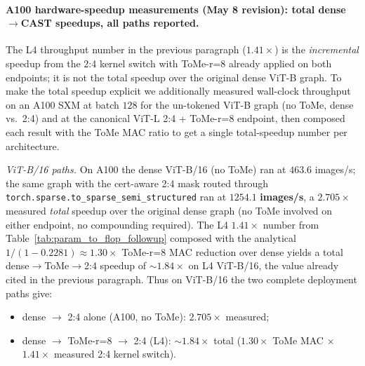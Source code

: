 \documentclass[11pt]{article}
\theoremstyle{plain}
\theoremstyle{definition}
\theoremstyle{remark}
\newcommand{\1}{\mathbf{1}}
\begin{document}
\paragraph{A100 hardware-speedup measurements (May 8 revision): total dense\(\to\)CAST speedups, all paths reported.}
The L4 throughput number in the previous paragraph (\(1.41\!\times\)) is the \emph{incremental} speedup from the 2:4 kernel switch with ToMe-r=8 already applied on both endpoints; it is not the total speedup over the original dense ViT-B graph.  To make the total speedup explicit we additionally measured wall-clock throughput on an A100 SXM at batch \(128\) for the un-tokened ViT-B graph (no ToMe, dense vs.\ 2:4) and at the canonical ViT-L 2:4 + ToMe-r=8 endpoint, then composed each result with the ToMe MAC ratio to get a single total-speedup number per architecture.

\medskip
\noindent\emph{ViT-B/16 paths.}  On A100 the dense ViT-B/16 (no ToMe) ran at \(463.6\) images/s; the same graph with the cert-aware 2:4 mask routed through \texttt{torch.sparse.to\_sparse\_semi\_structured} ran at \(\mathbf{1254.1}\) \textbf{images/s}, a \(\mathbf{2.705\!\times}\) measured \emph{total} speedup over the original dense graph (no ToMe involved on either endpoint, no compounding required).  The L4 \(1.41\!\times\) number from Table~\ref{tab:param_to_flop_followup} composed with the analytical \(1/(1-0.2281)\!\approx\!1.30\!\times\) ToMe-r=8 MAC reduction over dense yields a total dense\(\to\)ToMe\(\to\)2:4 speedup of \(\mathbf{\sim 1.84\!\times}\) on L4 ViT-B/16, the value already cited in the previous paragraph.  Thus on ViT-B/16 the two complete deployment paths give:
\begin{itemize}
\setlength\itemsep{0pt}
\item dense \(\to\) 2:4 alone (A100, no ToMe): \(\boldsymbol{2.705\!\times}\) measured;
\item dense \(\to\) ToMe-r=8 \(\to\) 2:4 (L4): \(\boldsymbol{\sim 1.84\!\times}\) total (\(1.30\!\times\) ToMe MAC \(\times\) \(1.41\!\times\) measured 2:4 kernel switch).
\end{itemize}
\end{document}
